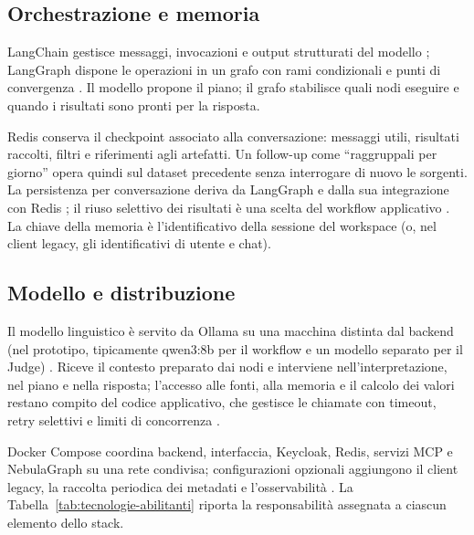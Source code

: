 \subsection{Orchestrazione e memoria}

LangChain gestisce messaggi, invocazioni e output strutturati del modello
\cite{langchainDocs}; LangGraph dispone le operazioni in un grafo con rami
condizionali e punti di convergenza \cite{langgraphDocs}. Il modello propone il
piano; il grafo stabilisce quali nodi eseguire e quando i risultati sono pronti
per la risposta.

Redis conserva il checkpoint associato alla conversazione: messaggi utili,
risultati raccolti, filtri e riferimenti agli artefatti. Un follow-up come
``raggruppali per giorno'' opera quindi sul dataset precedente senza
interrogare di nuovo le sorgenti. La persistenza per conversazione deriva da
LangGraph e dalla sua integrazione con Redis
\cite{langgraphPersistence,redisCheckpointer}; il riuso selettivo dei risultati
è una scelta del workflow applicativo \cite{guidaProgetto2026}. La chiave della
memoria è l'identificativo della sessione del workspace (o, nel client legacy,
gli identificativi di utente e chat).

\subsection{Modello e distribuzione}

Il modello linguistico è servito da Ollama su una macchina distinta dal backend
(nel prototipo, tipicamente qwen3:8b per il workflow e un modello separato per
il Judge) \cite{ollamaDocs}. Riceve il contesto preparato dai nodi e interviene
nell'interpretazione, nel piano e nella risposta; l'accesso alle fonti, alla
memoria e il calcolo dei valori restano compito del codice applicativo, che
gestisce le chiamate con timeout, retry selettivi e limiti di concorrenza
\cite{guidaProgetto2026}.

Docker Compose coordina backend, interfaccia, Keycloak, Redis, servizi MCP e
NebulaGraph su una rete condivisa; configurazioni opzionali aggiungono il client
legacy, la raccolta periodica dei metadati e l'osservabilità
\cite{dockerComposeDocs,guidaProgetto2026}. La
Tabella~\ref{tab:tecnologie-abilitanti} riporta la responsabilità assegnata a
ciascun elemento dello stack.

